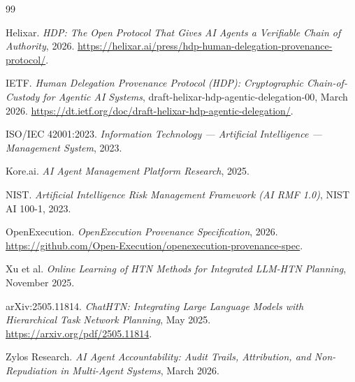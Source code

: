 \begin{thebibliography}{99}
\item Helixar. \emph{HDP: The Open Protocol That Gives AI Agents a Verifiable Chain of Authority}, 2026. \url{https://helixar.ai/press/hdp-human-delegation-provenance-protocol/}.

\item IETF. \emph{Human Delegation Provenance Protocol (HDP): Cryptographic Chain-of-Custody for Agentic AI Systems}, draft-helixar-hdp-agentic-delegation-00, March 2026. \url{https://dt.ietf.org/doc/draft-helixar-hdp-agentic-delegation/}.

\item ISO/IEC 42001:2023. \emph{Information Technology --- Artificial Intelligence --- Management System}, 2023.

\item Kore.ai. \emph{AI Agent Management Platform Research}, 2025.

\item NIST. \emph{Artificial Intelligence Risk Management Framework (AI RMF 1.0)}, NIST AI 100-1, 2023.

\item OpenExecution. \emph{OpenExecution Provenance Specification}, 2026. \url{https://github.com/Open-Execution/openexecution-provenance-spec}.

\item Xu et al. \emph{Online Learning of HTN Methods for Integrated LLM-HTN Planning}, November 2025.

\item arXiv:2505.11814. \emph{ChatHTN: Integrating Large Language Models with Hierarchical Task Network Planning}, May 2025. \url{https://arxiv.org/pdf/2505.11814}.

\item Zylos Research. \emph{AI Agent Accountability: Audit Trails, Attribution, and Non-Repudiation in Multi-Agent Systems}, March 2026.

\end{thebibliography}